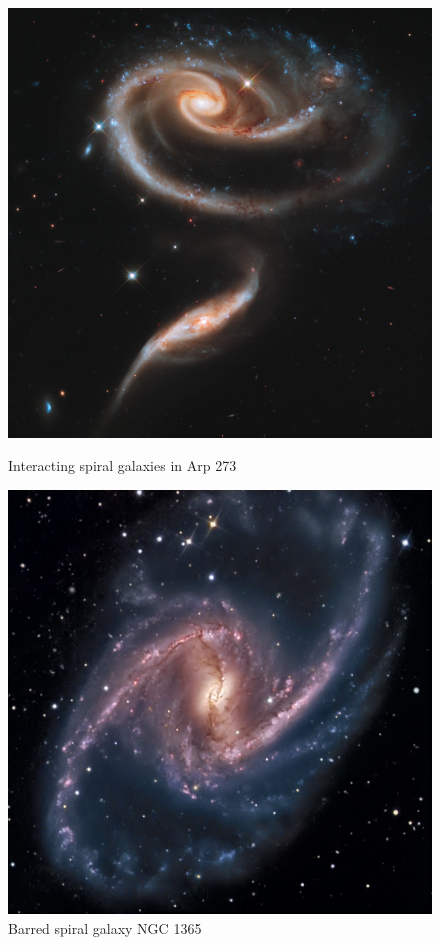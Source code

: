 \documentclass[12pt, oneside]{smuthesis}
\begin{document}
\begin{figure}[H]
	\centering
	\begin{minipage}{0.48\textwidth}
		\centering
		\includegraphics[width=0.9\linewidth]{Arp273}
		\caption{Interacting spiral galaxies in Arp 273 \citep{arp273}}
		\label{fig:Arp273}
	\end{minipage}
	\begin{minipage}{0.04\textwidth}
		\centering
	\end{minipage}
	\begin{minipage}{0.48\textwidth}
		\centering
		\includegraphics[width=0.9\linewidth]{NGC1365}
		\caption{Barred spiral galaxy NGC 1365 \citep{ngc1365}}
		\label{fig:NGC1365}
	\end{minipage}
\end{figure}
\end{document}
